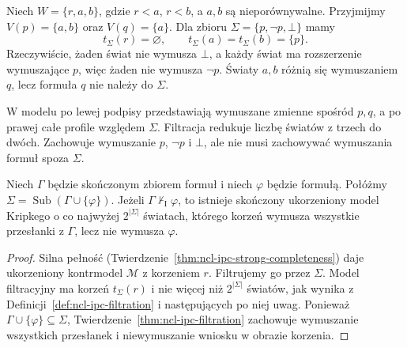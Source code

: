 \begin{przyklad}
\label{ex:ncl-ipc-filtration}
Niech $W=\{r,a,b\}$, gdzie $r<a$, $r<b$,
a $a,b$ są nieporównywalne. Przyjmijmy
$V(p)=\{a,b\}$ oraz $V(q)=\{a\}$.
Dla zbioru $\Sigma=\{p,\neg p,\bot\}$ mamy
\[
 t_\Sigma(r)=\varnothing,\qquad
 t_\Sigma(a)=t_\Sigma(b)=\{p\}.
\]
Rzeczywiście, żaden świat nie wymusza $\bot$,
a każdy świat ma rozszerzenie wymuszające $p$,
więc żaden nie wymusza $\neg p$.
Światy $a,b$ różnią się wymuszaniem $q$, lecz
formuła $q$ nie należy do $\Sigma$.
\begin{center}
\end{center}
W modelu po lewej podpisy przedstawiają wymuszane
zmienne spośród $p,q$, a po prawej całe profile
względem $\Sigma$. Filtracja redukuje liczbę światów
z trzech do dwóch. Zachowuje wymuszanie $p$,
$\neg p$ i $\bot$, ale nie musi zachowywać
wymuszania formuł spoza $\Sigma$.
\end{przyklad}

\begin{twierdzenie}
\label{thm:ncl-ipc-finite-model-property}
Niech $\Gamma$ będzie skończonym zbiorem formuł
i niech $\varphi$ będzie formułą. Połóżmy
$\Sigma=\operatorname{Sub}(\Gamma\cup\{\varphi\})$.
Jeżeli $\Gamma\nvdash_{\mathrm I}\varphi$, to istnieje
skończony ukorzeniony model Kripkego o co najwyżej
$2^{|\Sigma|}$ światach, którego korzeń wymusza
wszystkie przesłanki z $\Gamma$, lecz nie wymusza
$\varphi$.
\end{twierdzenie}
\begin{proof}
Silna pełność
(Twierdzenie~\ref{thm:ncl-ipc-strong-completeness})
daje ukorzeniony kontrmodel $\mathcal M$ z korzeniem
$r$. Filtrujemy go przez $\Sigma$.
Model filtracyjny ma korzeń $t_\Sigma(r)$ i nie
więcej niż $2^{|\Sigma|}$ światów, jak wynika
z Definicji~\ref{def:ncl-ipc-filtration} i następujących
po niej uwag.
Ponieważ $\Gamma\cup\{\varphi\}\subseteq\Sigma$,
Twierdzenie~\ref{thm:ncl-ipc-filtration}
zachowuje wymuszanie wszystkich przesłanek
i niewymuszanie wniosku w obrazie korzenia.
\end{proof}

